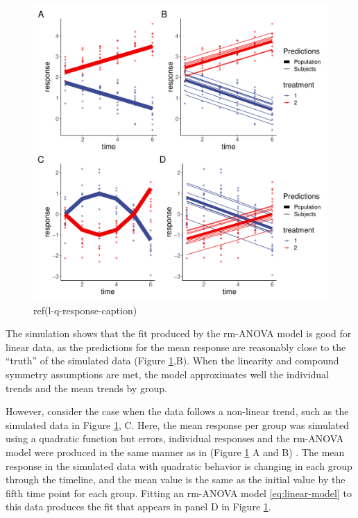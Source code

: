 \documentclass[
]{article}
\begin{document}
\begin{figure}[!h]

{\centering \includegraphics[width=0.75\linewidth,]{Full_document_files/figure-latex/l-q-response-1} 

}

\caption{ref(l-q-response-caption)}\label{fig:l-q-response}
\end{figure}

The simulation shows that the fit produced by the rm-ANOVA model is good for linear data, as the predictions for the mean response are reasonably close to the ``truth'' of the simulated data (Figure \ref{fig:l-q-response},B). When the linearity and compound symmetry assumptions are met, the model approximates well the individual trends and the mean trends by group.

However, consider the case when the data follows a non-linear trend, such as the simulated data in Figure \ref{fig:l-q-response}, C. Here, the mean response per group was simulated using a quadratic function but errors, individual responses and the rm-ANOVA model were produced in the same manner as in (Figure \ref{fig:l-q-response} A and B) . The mean response in the simulated data with quadratic behavior is changing in each group through the timeline, and the mean value is the same as the initial value by the fifth time point for each group. Fitting an rm-ANOVA model \eqref{eq:linear-model} to this data produces the fit that appears in panel D in Figure \ref{fig:l-q-response}.
\end{document}
